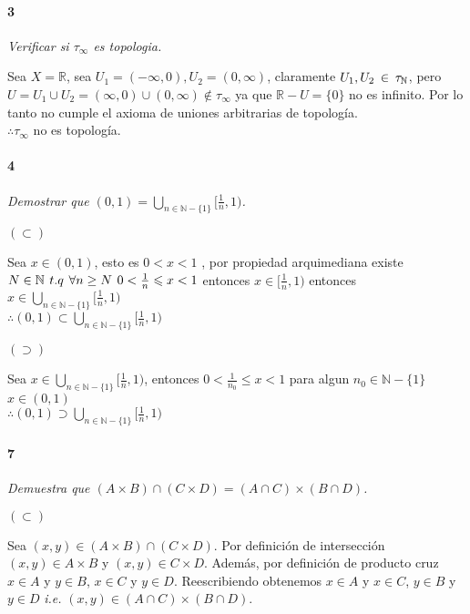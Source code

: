 \documentclass[12pt]{article}
\begin{document}
\paragraph{3}
\textit{Verificar si $\tau_{\infty}$ es topologia.} 

Sea $X=\mathbb{R}$, sea $U_1 = (-\infty,0),U_2 = (0,\infty)$, claramente $U_1,U_{2}\hspace{2px}\in\hspace{2px}\tau_{\mathbb{N}}$, pero $U=U_1\cup U_2 = (\infty,0)\cup(0,\infty)\notin \tau_{\infty}$
ya que $\mathbb{R}-U=\{0\}$ no es infinito. Por lo tanto no cumple el axioma de uniones arbitrarias de topología.\\ $\therefore\tau_{\infty}$ no es topología.\\

\paragraph{4}
\textit{Demostrar que $(0,1)=\bigcup\limits_{n\in\mathbb{N}-\{1\}}[\frac{1}{n},1)$.}

$(\subset)$

Sea $x\in(0,1)$, esto es $0<x<1$ , por propiedad arquimediana existe $ N \in\mathbb{N}\hspace{4px}t.q \hspace{4px} \forall n\geq N \hspace{4px} 0< \frac{1}{n} \leqslant  x<1$ entonces $x\in[\frac{1}{n},1)$
entonces $x\in\bigcup\limits_{n\in\mathbb{N}-\{1\}}[\frac{1}{n},1)$\\$\therefore(0,1)\subset\bigcup\limits_{n\in\mathbb{N}-\{1\}}[\frac{1}{n},1)$

$(\supset)$

Sea $x\in\bigcup\limits_{n\in\mathbb{N}-\{1\}}[\frac{1}{n},1)$, entonces $0<\frac{1}{n_0}\leq x<1$ para algun $n_0\in\mathbb{N}-\{1\}$\\$x\in(0,1)$\\$\therefore(0,1)\supset\bigcup\limits_{n\in\mathbb{N}-\{1\}}[\frac{1}{n},1)$

\paragraph{7}
\textit{Demuestra que $(A \times B) \cap (C \times D)= (A \cap C) \times (B \cap D)$.}

$(\subset)$

Sea $(x,y) \in (A \times B) \cap (C \times D)$. Por definición de intersección $(x,y)\in A\times B$ y $(x,y) \in C\times D$. Además, por definición
de producto cruz $x \in A $ y $y \in B$, $x \in C$ y $y \in D$. Reescribiendo obtenemos $x\in A$ y $x\in C$, $y \in B$ y $y\in D$ \textit{i.e.}  $(x,y) \in (A \cap C)\times (B \cap D)$.
\end{document}
